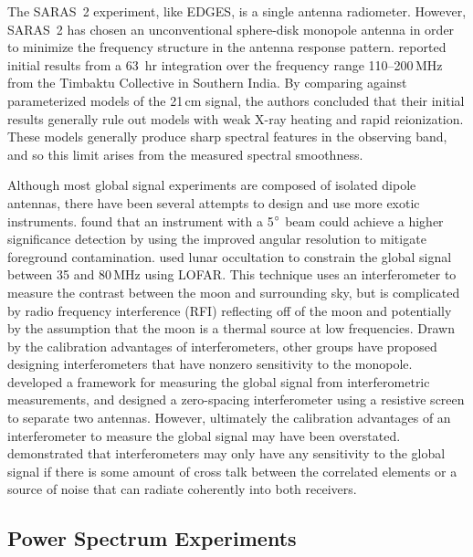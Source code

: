 \begin{bibunit}
The SARAS~2 experiment, like EDGES, is a single antenna radiometer. However, SARAS~2 has chosen an
unconventional sphere-disk monopole antenna in order to minimize the frequency structure in the
antenna response pattern. \citet{2017ApJ...845L..12S} reported initial results from a 63~hr
integration over the frequency range 110--200\,MHz from the Timbaktu Collective in Southern India.
By comparing against parameterized models of the 21\,cm signal, the authors concluded that their
initial results generally rule out models with weak X-ray heating and rapid reionization. These
models generally produce sharp spectral features in the observing band, and so this limit arises
from the measured spectral smoothness.

Although most global signal experiments are composed of isolated dipole antennas, there have been
several attempts to design and use more exotic instruments. \citet{2013PhRvD..87d3002L} found that
an instrument with a 5$\mbox{$^\circ$}$ beam could achieve a higher significance detection by using the
improved angular resolution to mitigate foreground contamination. \citet{2015MNRAS.450.2291V} used
lunar occultation to constrain the global signal between 35 and 80\,MHz using LOFAR. This technique
uses an interferometer to measure the contrast between the moon and surrounding sky, but is
complicated by radio frequency interference (RFI) reflecting off of the moon and potentially by the
assumption that the moon is a thermal source at low frequencies. Drawn by the calibration advantages
of interferometers, other groups have proposed designing interferometers that have nonzero
sensitivity to the monopole. \citet{2015ApJ...809...18P} developed a framework for measuring the
global signal from interferometric measurements, and \citet{2015ApJ...815...88S} designed a
zero-spacing interferometer using a resistive screen to separate two antennas. However, ultimately
the calibration advantages of an interferometer to measure the global signal may have been
overstated.  \citet{2016ApJ...826..116V} demonstrated that interferometers may only have any
sensitivity to the global signal if there is some amount of cross talk between the correlated
elements or a source of noise that can radiate coherently into both receivers.

\subsection{Power Spectrum Experiments}


\end{bibunit}
